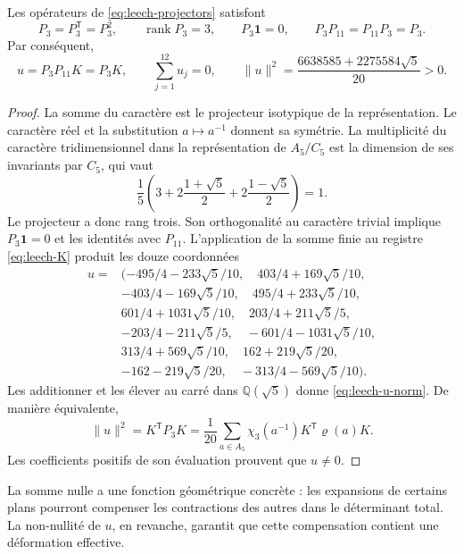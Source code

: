 \begin{lemma}
\label{lem:leech-u}
Les opérateurs de \eqref{eq:leech-projectors} satisfont
\[
 P_3=P_3^{\mathsf T}=P_3^2,\qquad
 \operatorname{rank}P_3=3,\qquad P_3\mathbf1=0,\qquad
 P_3P_{11}=P_{11}P_3=P_3.
\]
Par conséquent,
\begin{equation}
 u=P_3P_{11}K=P_3K,\qquad
 \sum_{j=1}^{12}u_j=0,\qquad
 \|u\|^2=\frac{6638585+2275584\sqrt5}{20}>0.
 \label{eq:leech-u-norm}
\end{equation}
\end{lemma}
\begin{proof}
La somme du caractère est le projecteur isotypique de la représentation.
Le caractère réel et la substitution \(a\mapsto a^{-1}\)
donnent sa symétrie. La multiplicité du caractère tridimensionnel dans la
représentation de \(A_5/C_5\) est la dimension de ses invariants par
\(C_5\), qui vaut
\[
 \frac15\left(
 3+2\frac{1+\sqrt5}{2}+2\frac{1-\sqrt5}{2}
 \right)=1.
\]
Le projecteur a donc rang trois. Son orthogonalité au caractère
trivial implique \(P_3\mathbf1=0\) et les identités avec \(P_{11}\).
L’application de la somme finie au registre
\eqref{eq:leech-K} produit les douze coordonnées
\begin{equation}
\begin{aligned}
u={}&(-495/4-233\sqrt5/10,\quad403/4+169\sqrt5/10,\\
&-403/4-169\sqrt5/10,\quad495/4+233\sqrt5/10,\\
&601/4+1031\sqrt5/10,\quad203/4+211\sqrt5/5,\\
&-203/4-211\sqrt5/5,\quad-601/4-1031\sqrt5/10,\\
&313/4+569\sqrt5/10,\quad162+219\sqrt5/20,\\
&-162-219\sqrt5/20,\quad-313/4-569\sqrt5/10).
\end{aligned}
\label{eq:leech-u-coordinates}
\end{equation}
Les additionner et les élever au carré dans \(\mathbb Q(\sqrt5)\) donne \eqref{eq:leech-u-norm}. De manière équivalente,
\[
 \|u\|^2=K^{\mathsf T}P_3K
 =\frac1{20}\sum_{a\in A_5}
          \chi_3(a^{-1})K^{\mathsf T}\varrho(a)K.
\]
Les coefficients positifs de son évaluation prouvent que \(u\ne0\).
\end{proof}

La somme nulle a une fonction géométrique concrète : les expansions de certains plans pourront compenser les contractions des autres dans le déterminant total. La non-nullité de \(u\), en revanche, garantit que cette compensation contient une déformation effective.

